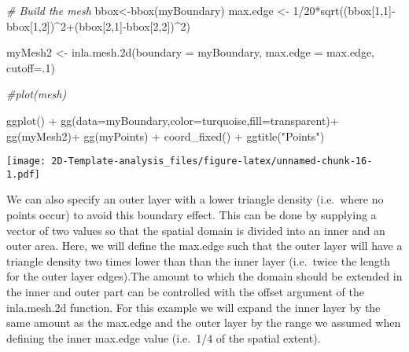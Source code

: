 \documentclass[
]{article}
\newenvironment{Shaded}{\begin{snugshade}}{\end{snugshade}}
\newcommand{\AttributeTok}[1]{\textcolor[rgb]{0.77,0.63,0.00}{#1}}
\newcommand{\CommentTok}[1]{\textcolor[rgb]{0.56,0.35,0.01}{\textit{#1}}}
\newcommand{\DecValTok}[1]{\textcolor[rgb]{0.00,0.00,0.81}{#1}}
\newcommand{\FunctionTok}[1]{\textcolor[rgb]{0.00,0.00,0.00}{#1}}
\newcommand{\NormalTok}[1]{#1}
\newcommand{\OtherTok}[1]{\textcolor[rgb]{0.56,0.35,0.01}{#1}}
\newcommand{\SpecialCharTok}[1]{\textcolor[rgb]{0.00,0.00,0.00}{#1}}
\newcommand{\StringTok}[1]{\textcolor[rgb]{0.31,0.60,0.02}{#1}}
\begin{document}
\begin{Shaded}
\begin{Highlighting}[]
\CommentTok{\# Build the mesh}
\NormalTok{bbox}\OtherTok{\textless{}{-}}\FunctionTok{bbox}\NormalTok{(myBoundary)}
\NormalTok{max.edge }\OtherTok{\textless{}{-}} \DecValTok{1}\SpecialCharTok{/}\DecValTok{20}\SpecialCharTok{*}\FunctionTok{sqrt}\NormalTok{((bbox[}\DecValTok{1}\NormalTok{,}\DecValTok{1}\NormalTok{]}\SpecialCharTok{{-}}\NormalTok{bbox[}\DecValTok{1}\NormalTok{,}\DecValTok{2}\NormalTok{])}\SpecialCharTok{\^{}}\DecValTok{2}\SpecialCharTok{+}\NormalTok{(bbox[}\DecValTok{2}\NormalTok{,}\DecValTok{1}\NormalTok{]}\SpecialCharTok{{-}}\NormalTok{bbox[}\DecValTok{2}\NormalTok{,}\DecValTok{2}\NormalTok{])}\SpecialCharTok{\^{}}\DecValTok{2}\NormalTok{)}

\NormalTok{myMesh2 }\OtherTok{\textless{}{-}} \FunctionTok{inla.mesh.2d}\NormalTok{(}\AttributeTok{boundary =}\NormalTok{ myBoundary,}
                    \AttributeTok{max.edge =}\NormalTok{ max.edge,}
                    \AttributeTok{cutoff=}\NormalTok{.}\DecValTok{1}\NormalTok{)}

\CommentTok{\#plot(mesh)}

\FunctionTok{ggplot}\NormalTok{() }\SpecialCharTok{+}
     \FunctionTok{gg}\NormalTok{(}\AttributeTok{data=}\NormalTok{myBoundary,}\AttributeTok{color=}\StringTok{\textquotesingle{}turquoise\textquotesingle{}}\NormalTok{,}\AttributeTok{fill=}\StringTok{\textquotesingle{}transparent\textquotesingle{}}\NormalTok{)}\SpecialCharTok{+}  
  \FunctionTok{gg}\NormalTok{(myMesh2)}\SpecialCharTok{+}
  \FunctionTok{gg}\NormalTok{(myPoints) }\SpecialCharTok{+}
  \FunctionTok{coord\_fixed}\NormalTok{() }\SpecialCharTok{+}
  \FunctionTok{ggtitle}\NormalTok{(}\StringTok{"Points"}\NormalTok{)}
\end{Highlighting}
\end{Shaded}

\texttt{[image: 2D-Template-analysis\_files/figure-latex/unnamed-chunk-16-1.pdf]}

We can also specify an outer layer with a lower triangle density
(i.e.~where no points occur) to avoid this boundary effect. This can be
done by supplying a vector of two values so that the spatial domain is
divided into an inner and an outer area. Here, we will define the
max.edge such that the outer layer will have a triangle density two
times lower than than the inner layer (i.e.~twice the length for the
outer layer edges).The amount to which the domain should be extended in
the inner and outer part can be controlled with the offset argument of
the inla.mesh.2d function. For this example we will expand the inner
layer by the same amount as the max.edge and the outer layer by the
range we assumed when defining the inner max.edge value (i.e.~1/4 of the
spatial extent).
\end{document}
